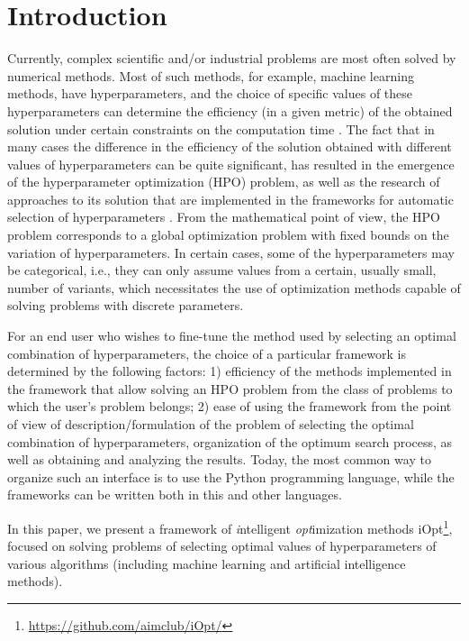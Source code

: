 \documentclass[preprint,12pt]{elsarticle}
\begin{document}

\section{Introduction}
\label{sec_intro}

Currently, complex scientific and/or industrial problems are most often solved by numerical methods. Most of such methods, for example, machine learning methods, have hyperparameters, and the choice of specific values of these hyperparameters can determine the efficiency (in a given metric) of the obtained solution under certain constraints on the computation time \cite{Hutter2019,nikitin2021}. The fact that in many cases the difference in the efficiency of the solution obtained with different values of hyperparameters can be quite significant, has resulted in the emergence of the hyperparameter optimization (HPO) problem, as well as the research of approaches to its solution that are implemented in the frameworks for automatic selection of hyperparameters \cite{Tune, optuna, hyperopt,Sherpa}. From the mathematical point of view, the HPO problem corresponds to a global optimization problem with fixed bounds on the variation of hyperparameters.  In certain cases, some of the hyperparameters may be categorical, i.e., they can only assume values from a certain, usually small, number of variants, which necessitates the use of optimization methods capable of solving problems with discrete parameters.

For an end user who wishes to fine-tune the method used by selecting an optimal combination of hyperparameters, the choice of a particular framework is determined by the following factors: 1) efficiency of the methods implemented in the framework that allow solving an HPO problem from the class of problems to which the user's problem belongs; 2) ease of using the  framework from the point of view of description/formulation of the problem of selecting the optimal combination of hyperparameters, organization of the optimum search process, as well as obtaining and analyzing the results. Today, the most common way to organize such an interface is to use the Python programming language, while the frameworks can be written both in this and other languages.

In this paper, we present a framework of \textit{i}ntelligent \textit{opt}imization methods  \textcolor[rgb]{1,0,0}{iOpt\footnote{\url{https://github.com/aimclub/iOpt/}}}, focused on solving problems of selecting optimal values of hyperparameters of various algorithms (including machine learning \textcolor[rgb]{1,0,0}{and artificial intelligence} methods). 
\end{document}
